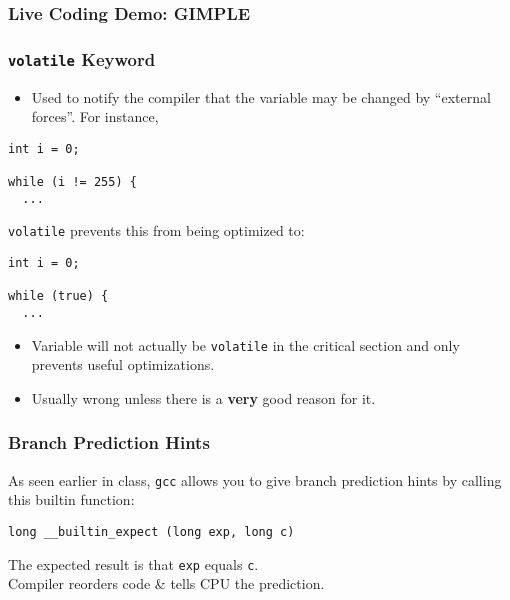 \documentclass[aspectratio=43]{beamer}
\newenvironment{changemargin}[1]{%
  \begin{list}{}{%
    \setlength{\topsep}{0pt}%
    \setlength{\leftmargin}{#1}%
    \setlength{\rightmargin}{1em}
    \setlength{\listparindent}{\parindent}%
    \setlength{\itemindent}{\parindent}%
    \setlength{\parsep}{\parskip}%
  }%
  \item[]}{\end{list}}
\begin{document}
\begin{frame}
  \frametitle{Live Coding Demo: GIMPLE}
\end{frame}

\begin{frame}[fragile]
  \frametitle{{\tt volatile} Keyword}

\begin{changemargin}{1.5cm}
  \begin{itemize}
    \item Used to notify the compiler that the variable may be changed by ``external forces''. For instance,
  \end{itemize}

  \begin{lstlisting}
int i = 0;

while (i != 255) {
  ...
  \end{lstlisting}

{\tt volatile} prevents this from being optimized to:

  \begin{lstlisting}
int i = 0;

while (true) {
  ...
  \end{lstlisting}

  \begin{itemize}
    \item Variable will not actually be {\tt volatile} in the critical section
      and only prevents useful optimizations.
    \item Usually wrong unless there is a {\bf very} good reason for it.
  \end{itemize}
\end{changemargin}

\end{frame}

\begin{frame}[fragile]
  \frametitle{Branch Prediction Hints}

  \begin{changemargin}{1.5cm}
  As seen earlier in class, {\tt gcc} allows you to give branch
  prediction hints by calling this builtin function:

  \begin{center}
    \verb+long __builtin_expect (long exp, long c)+
  \end{center}

  The expected result is that {\tt exp} equals {\tt c}.\\[1em]
  Compiler reorders code \& tells CPU the prediction.
  
  \end{changemargin}
\end{frame}
\end{document}
